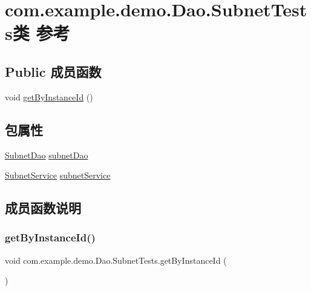 \hypertarget{classcom_1_1example_1_1demo_1_1_dao_1_1_subnet_tests}{}\section{com.\+example.\+demo.\+Dao.\+Subnet\+Tests类 参考}
\label{classcom_1_1example_1_1demo_1_1_dao_1_1_subnet_tests}
\subsection*{Public 成员函数}
\begin{DoxyCompactItemize}
\item 
void \mbox{\hyperlink{classcom_1_1example_1_1demo_1_1_dao_1_1_subnet_tests_ae136412382180136a8a564c940fa211f}{get\+By\+Instance\+Id}} ()
\end{DoxyCompactItemize}
\subsection*{包属性}
\begin{DoxyCompactItemize}
\item 
\mbox{\hyperlink{interfacecom_1_1example_1_1demo_1_1dao_1_1_subnet_dao}{Subnet\+Dao}} \mbox{\hyperlink{classcom_1_1example_1_1demo_1_1_dao_1_1_subnet_tests_a15e1f44d95338362d39496015c27d34e}{subnet\+Dao}}
\item 
\mbox{\hyperlink{classcom_1_1example_1_1demo_1_1service_1_1_subnet_service}{Subnet\+Service}} \mbox{\hyperlink{classcom_1_1example_1_1demo_1_1_dao_1_1_subnet_tests_a711b940d679dde6d3959c4028be40950}{subnet\+Service}}
\end{DoxyCompactItemize}


\subsection{成员函数说明}
\mbox{\label{classcom_1_1example_1_1demo_1_1_dao_1_1_subnet_tests_ae136412382180136a8a564c940fa211f}} 
\subsubsection{\texorpdfstring{get\+By\+Instance\+Id()}{getByInstanceId()}}
{\footnotesize\ttfamily void com.\+example.\+demo.\+Dao.\+Subnet\+Tests.\+get\+By\+Instance\+Id (\begin{DoxyParamCaption}{ }\end{DoxyParamCaption})}



